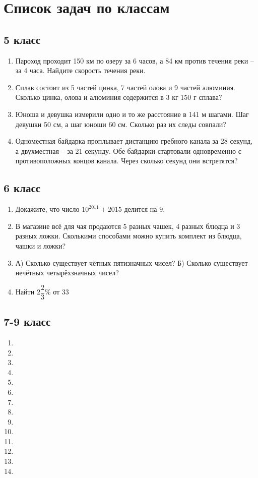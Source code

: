 \section*{Список задач по классам}
\subsection*{5 класс}
\begin{enumerate}[label=\textbf{\arabic*}.]
	\item Пароход проходит 150 км по озеру за 6 часов, а 84 км против течения реки – за 4 часа.
	Найдите скорость течения реки.
	\item Сплав состоит из 5 частей цинка, 7 частей олова и 9 частей алюминия. Сколько цинка,
	олова и алюминия содержится в 3 кг 150 г сплава?
	\item Юноша и девушка измерили одно и то же расстояние в 141 м шагами. Шаг девушки 50 см,
	а шаг юноши 60 см. Сколько раз их следы совпали?
	\item Одноместная байдарка проплывает дистанцию гребного канала за 28 секунд, а
	двухместная – за 21 секунду. Обе байдарки стартовали одновременно с противоположных
	концов канала. Через сколько секунд они встретятся?
\end{enumerate}
\subsection*{6 класс}
\begin{enumerate}[label=\textbf{\arabic*}.]
	\item Докажите, что число \( 10^{2011}+2015 \) делится на \( 9 \).
	\item В магазине всё для чая продаются 5 разных чашек, 4 разных блюдца и 3 разных ложки. Сколькими способами можно купить комплект из блюдца, чашки и ложки?
	\item А) Сколько существует чётных пятизначных чисел? Б) Сколько существует нечётных четырёхзначных чисел?
	\item Найти \( 2\dfrac{2}{3}\% \) от \( 33 \)
\end{enumerate}
\subsection*{7-9 класс}
\begin{enumerate}[label=\textbf{\arabic*}.]
	\item {}
	\item {}
	\item {}
	\item {}
	\item {}
	\item {}
	\item {}
	\item {}
	\item {}
	\item {}
	\item {}
	\item {}
	\item {}
	\item {}
\end{enumerate}

